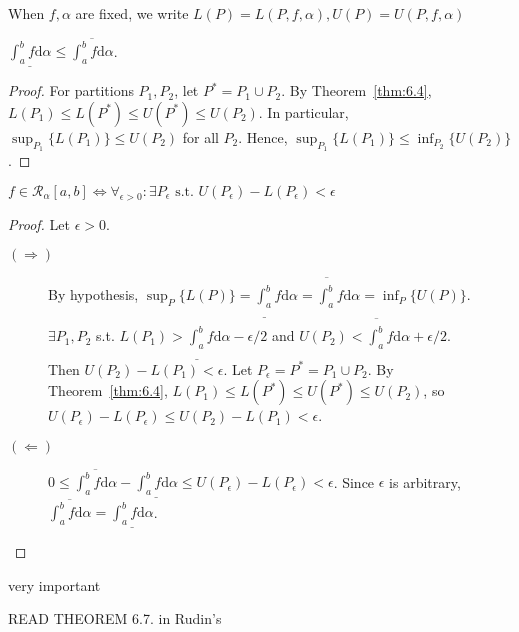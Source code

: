 \begin{notation}
	When $f,\alpha$ are fixed, we write $L(P)=L(P,f,\alpha),U(P)=U(P,f,\alpha)$
\end{notation}

\begin{thm}[5]
	$\underline{\int_{a}^{b}{f\mathrm{d}\alpha}}\le  \overline{\int_{a}^{b}{f\mathrm{d}\alpha}}$.
	\begin{proof}
		For partitions $P_1,P_2$, let $P^{*}=P_1 \cup P_2$.
		By Theorem~\ref{thm:6.4}, $L(P_1)\le L(P^{*})\le U(P^{*})\le U(P_2)$.
		In particular, $\sup_{P_1}\{L(P_1)\}\le U(P_2)$ for all $P_2$.
		Hence, $\sup_{P_1}\{L(P_1)\}\le \inf_{P_2}\{U(P_2)\}$.
	\end{proof}
\end{thm}
\begin{thm}[6]
	$f \in \mathscr{R}_{\alpha}[a,b]\Leftrightarrow \forall_{\epsilon > 0}: \exists P_{\epsilon} \text{ s.t. } U(P_{\epsilon})-L(P_{\epsilon})<\epsilon$
	\begin{proof}
		Let $\epsilon>0$.
		\begin{description}
			\item[$(\Rightarrow)$]
			      By hypothesis, $\sup_{P}\{L(P)\}= \underline{\int_{a}^{b}}f\mathrm{d}\alpha=\overline{\int_{a}^{b}}f\mathrm{d}\alpha=\inf_{P}\{U(P)\}$.\\
			      $\exists P_1,P_2$ s.t. $L(P_1)>\underline{\int_{a}^{b}}f\mathrm{d}\alpha-\epsilon/2$ and $U(P_2)<\overline{\int_{a}^{b}}f\mathrm{d}\alpha+\epsilon/2$.\\
			      Then $U(P_{2})-L(P_{1})<\epsilon$. Let $P_{\epsilon}=P^{*}=P_{1}\cup P_{2}$.
			      By Theorem~\ref{thm:6.4}, $L(P_{1})\le L(P^{*})\le U(P^{*})\le U(P_{2})$, so $U(P_{\epsilon})-L(P_{\epsilon})\le U(P_2)-L(P_1)<\epsilon$.
			\item[$(\Leftarrow)$]
			      $0\le \overline{\int_{a}^{b}{f\mathrm{d}\alpha}} - \underline{\int_{a}^{b}{f\mathrm{d}\alpha}}\le U(P_{\epsilon})-L(P_{\epsilon})<\epsilon$. Since $\epsilon$ is arbitrary, $\overline{\int_{a}^{b}{f\mathrm{d}\alpha}} = \underline{\int_{a}^{b}{f\mathrm{d}\alpha}}$.
		\end{description}
	\end{proof}
	\begin{remark}
		very important
	\end{remark}
\end{thm}

\begin{note}
	READ THEOREM 6.7. in Rudin's
\end{note}

